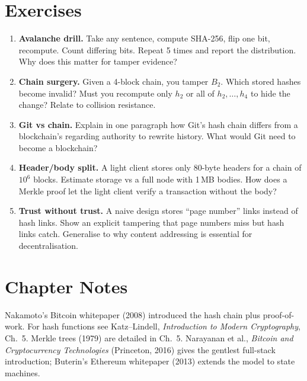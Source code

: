 \section{Exercises}\label{sec:ch01-exercises}
\begin{enumerate}[label=E1.\arabic*, leftmargin=*, itemsep=0.6em]
    \item \textbf{Avalanche drill.} Take any sentence, compute SHA-256, flip one bit, recompute. Count differing bits. Repeat 5 times and report the distribution. Why does this matter for tamper evidence?
    \item \textbf{Chain surgery.} Given a 4-block chain, you tamper $B_2$. Which stored hashes become invalid? Must you recompute only $h_2$ or all of $h_2,\dots,h_4$ to hide the change? Relate to collision resistance.
    \item \textbf{Git vs chain.} Explain in one paragraph how Git's hash chain differs from a blockchain's regarding authority to rewrite history. What would Git need to become a blockchain?
    \item \textbf{Header/body split.} A light client stores only 80-byte headers for a chain of $10^6$ blocks. Estimate storage vs a full node with 1\,MB bodies. How does a Merkle proof let the light client verify a transaction without the body?
    \item \textbf{Trust without trust.} A naive design stores ``page number'' links instead of hash links. Show an explicit tampering that page numbers miss but hash links catch. Generalise to why content addressing is essential for decentralisation.
\end{enumerate}

\section*{Chapter Notes}
Nakamoto's Bitcoin whitepaper (2008) introduced the hash chain plus proof-of-work. For hash functions see Katz--Lindell, \emph{Introduction to Modern Cryptography}, Ch.~5. Merkle trees (1979) are detailed in Ch.~5. Narayanan et al., \emph{Bitcoin and Cryptocurrency Technologies} (Princeton, 2016) gives the gentlest full-stack introduction; Buterin's Ethereum whitepaper (2013) extends the model to state machines.
